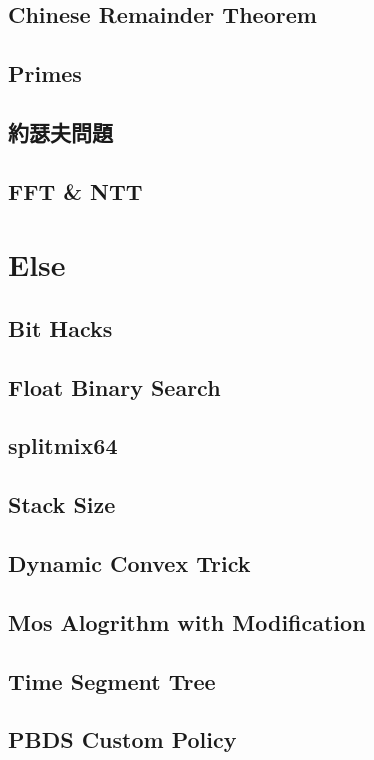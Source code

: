 \subsection{Chinese Remainder Theorem}

\subsection{Primes}

\subsection{約瑟夫問題}

\subsection{FFT \& NTT}


\section{Else}
\subsection{Bit Hacks}

\subsection{Float Binary Search}

\subsection{splitmix64}

\subsection{Stack Size}

\subsection{Dynamic Convex Trick}

\subsection{Mos Alogrithm with Modification}

\subsection{Time Segment Tree}

\subsection{PBDS Custom Policy}

